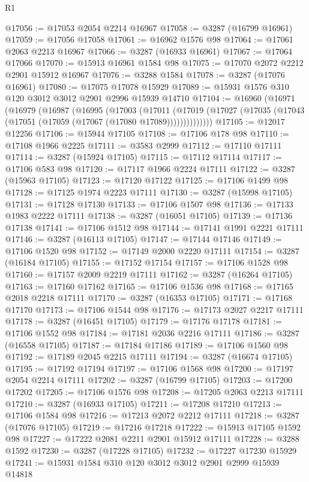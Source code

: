 \begin{lexlean}{R1}
\begin{coremodule}
@17056 := @17053 @2054 @2214 @16967
@17058 := @3287 (@16799 @16961)
@17059 := @17056 @17058
@17061 := @16962 @1576 @98
@17064 := @17061 @2063 @2213 @16967
@17066 := @3287 (@16933 @16961)
@17067 := @17064 @17066
@17070 := @15913 @16961 @1584 @98
@17075 := @17070 @2072 @2212 @2901 @15912 @16967
@17076 := @3288 @1584
@17078 := @3287 (@17076 @16961)
@17080 := @17075 @17078 @15929
@17089 := @15931 @1576 @310 @120 @3012 @3012 @2901 @2996 @15939 @14710
@17104 := @16960
    (@16971
      (@16979
        (@16987
          (@16995
            (@17003
              (@17011
                (@17019 (@17027 (@17035 (@17043 (@17051 (@17059 (@17067 (@17080 @17089))))))))))))))
@17105 := @12017 @12256
@17106 := @15944 @17105
@17108 := @17106 @178 @98
@17110 := @17108 @1966 @2225
@17111 := @3583 @2999
@17112 := @17110 @17111
@17114 := @3287 (@15924 @17105)
@17115 := @17112 @17114
@17117 := @17106 @583 @98
@17120 := @17117 @1966 @2224 @17111
@17122 := @3287 (@15963 @17105)
@17123 := @17120 @17122
@17125 := @17106 @1499 @98
@17128 := @17125 @1974 @2223 @17111
@17130 := @3287 (@15998 @17105)
@17131 := @17128 @17130
@17133 := @17106 @1507 @98
@17136 := @17133 @1983 @2222 @17111
@17138 := @3287 (@16051 @17105)
@17139 := @17136 @17138
@17141 := @17106 @1512 @98
@17144 := @17141 @1991 @2221 @17111
@17146 := @3287 (@16113 @17105)
@17147 := @17144 @17146
@17149 := @17106 @1520 @98
@17152 := @17149 @2000 @2220 @17111
@17154 := @3287 (@16184 @17105)
@17155 := @17152 @17154
@17157 := @17106 @1528 @98
@17160 := @17157 @2009 @2219 @17111
@17162 := @3287 (@16264 @17105)
@17163 := @17160 @17162
@17165 := @17106 @1536 @98
@17168 := @17165 @2018 @2218 @17111
@17170 := @3287 (@16353 @17105)
@17171 := @17168 @17170
@17173 := @17106 @1544 @98
@17176 := @17173 @2027 @2217 @17111
@17178 := @3287 (@16451 @17105)
@17179 := @17176 @17178
@17181 := @17106 @1552 @98
@17184 := @17181 @2036 @2216 @17111
@17186 := @3287 (@16558 @17105)
@17187 := @17184 @17186
@17189 := @17106 @1560 @98
@17192 := @17189 @2045 @2215 @17111
@17194 := @3287 (@16674 @17105)
@17195 := @17192 @17194
@17197 := @17106 @1568 @98
@17200 := @17197 @2054 @2214 @17111
@17202 := @3287 (@16799 @17105)
@17203 := @17200 @17202
@17205 := @17106 @1576 @98
@17208 := @17205 @2063 @2213 @17111
@17210 := @3287 (@16933 @17105)
@17211 := @17208 @17210
@17213 := @17106 @1584 @98
@17216 := @17213 @2072 @2212 @17111
@17218 := @3287 (@17076 @17105)
@17219 := @17216 @17218
@17222 := @15913 @17105 @1592 @98
@17227 := @17222 @2081 @2211 @2901 @15912 @17111
@17228 := @3288 @1592
@17230 := @3287 (@17228 @17105)
@17232 := @17227 @17230 @15929
@17241 := @15931 @1584 @310 @120 @3012 @3012 @2901 @2999 @15939 @14818

\end{coremodule}
\end{lexlean}

